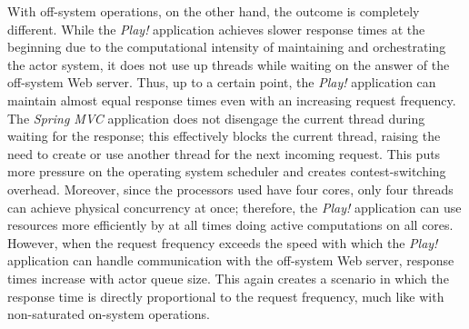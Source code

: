With off-system operations, on the other hand, the outcome is completely different. While the \textit{Play!} application achieves slower response times at the beginning due to the computational intensity of maintaining and orchestrating the actor system, it does not use up threads while waiting on the answer of the off-system Web server. Thus, up to a certain point, the \textit{Play!} application can maintain almost equal response times even with an increasing request frequency. The \textit{Spring MVC} application does not disengage the current thread during waiting for the response; this effectively blocks the current thread, raising the need to create or use another thread for the next incoming request. This puts more pressure on the operating system scheduler and creates contest-switching overhead. Moreover, since the processors used have four cores, only four threads can achieve physical concurrency at once; therefore, the \textit{Play!} application can use resources more efficiently by at all times doing active computations on all cores. However, when the request frequency exceeds the speed with which the \textit{Play!} application can handle communication with the off-system Web server, response times increase with actor queue size. This again creates a scenario in which the response time is directly proportional to the request frequency, much like with non-saturated on-system operations.













































